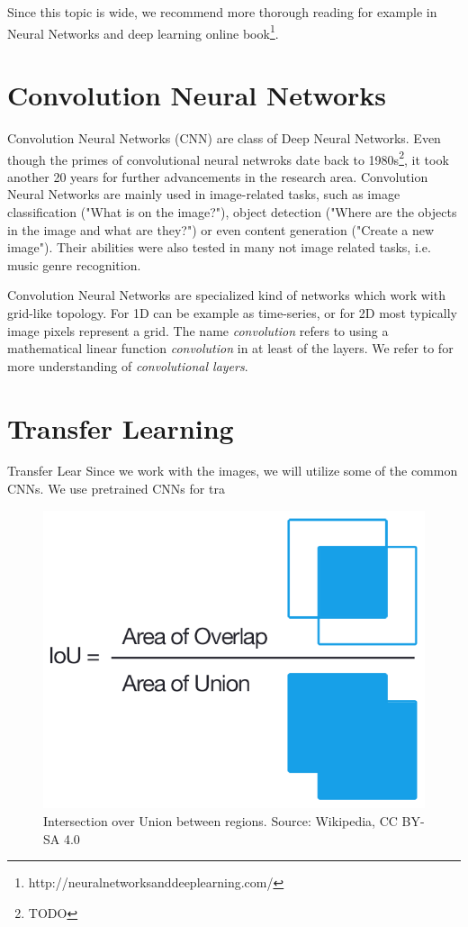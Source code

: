 Since this topic is wide, we recommend more thorough reading for example in Neural Networks and deep learning online book\footnote{http://neuralnetworksanddeeplearning.com/}.

\section{Convolution Neural Networks}

Convolution Neural Networks (CNN) are class of Deep Neural Networks. Even though the primes of convolutional neural netwroks date back to 1980s\footnote{TODO}, it took another 20 years for further advancements in the research area. Convolution Neural Networks are mainly used in image-related tasks, such as image classification ("What is on the image?"), object detection ("Where are the objects in the image and what are they?") or even content generation ("Create a new image"). Their abilities were also tested in many not image related tasks, i.e. music genre recognition.

Convolution Neural Networks are specialized kind of networks which work with grid-like topology. For 1D can be example as time-series, or for 2D most typically image pixels represent a grid. The name \emph{convolution} refers to using a mathematical linear function \emph{convolution} in at least of the layers. We refer to \cite{} for more understanding of \emph{convolutional layers}.

\section{Transfer Learning}

Transfer Lear
Since we work with the images, we will utilize some of the common CNNs. We use pretrained CNNs for tra 






\begin{figure}
    \centering
	\includegraphics[width=0.3\linewidth]{img/Intersection_over_Union_-_visual_equation.png}
	\caption{Intersection over Union between regions. Source: Wikipedia, CC BY-SA 4.0}
	\label{fig:intersection_over_union}
\end{figure}



